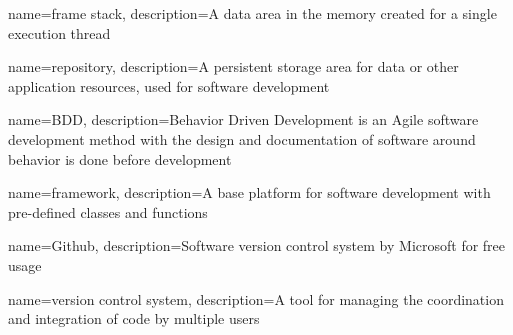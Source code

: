 {
    name={frame stack},
    description={A data area in the memory created for a single execution thread}
}

{
    name={repository},
    description={A persistent storage area for data or other application resources, used for software development}
}


{
    name={BDD},
    description={Behavior Driven Development is an Agile software development method with the design and documentation of software around behavior is done before development}
}

{
    name={framework},
    description={A base platform for software development with pre-defined classes and functions}
}


{
    name={Github},
    description={Software version control system by Microsoft for free usage}
}

{
    name={version control system},
    description={A tool for managing the coordination and integration of code by multiple users}
}


\glsaddall
